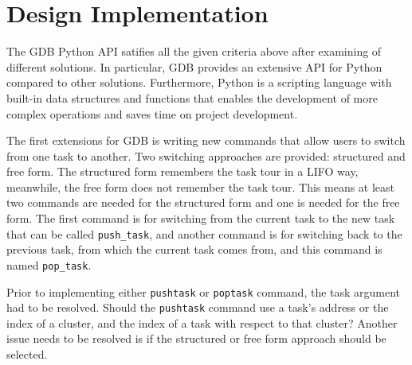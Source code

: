 \section{Design Implementation}
The GDB Python API satifies all the given criteria above after examining of different solutions. In particular, GDB provides an extensive API for
Python compared to other solutions. Furthermore, Python is a scripting language with built-in
data structures and functions that enables the development of more complex
operations and saves time on project development.

The first extensions for GDB is writing new commands that allow
users to switch from one \uCCS task to another. Two switching approaches are
provided: structured and free form. The structured form remembers the task tour in a
LIFO way, meanwhile, the free form does not remember the task tour. This means
at least two commands are needed for the structured form and one is needed for
the free form. The first command is for switching from the current task to
the new task that can be called \verb|push_task|, and another command
is for switching back to the previous task, from which the current task comes
from, and this command is named \verb|pop_task|.

Prior to implementing either \verb|pushtask| or \verb|poptask| command, the
task argument had to be resolved. Should the \verb|pushtask| command use a task's address or the index of a cluster, and the index of a task with respect
to that cluster? Another issue needs to be resolved is if the structured or free
form approach should be selected.

